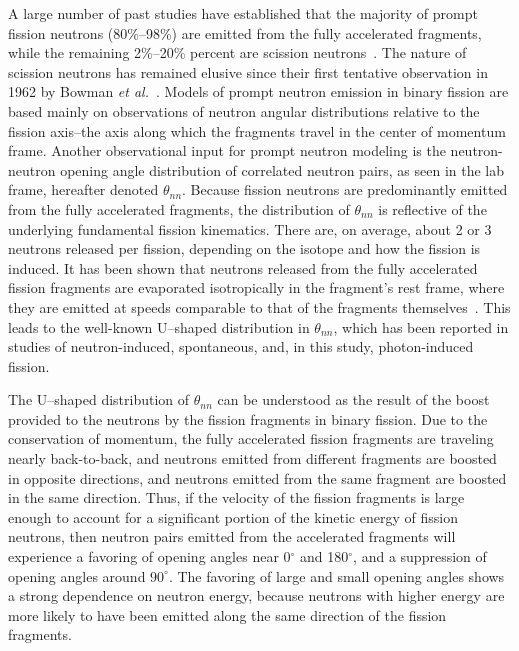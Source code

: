 A large number of past studies have established that the majority of prompt fission neutrons (80\%--98\%) are emitted from the fully accelerated fragments, while the remaining 2\%--20\% percent are scission neutrons~\cite{Scission2005}.
The nature of scission neutrons has remained elusive since their first tentative observation in 1962 by Bowman \emph{et al.}~\cite{Bowman}.
Models of prompt neutron emission in binary fission are based mainly on observations of neutron angular distributions relative to the fission axis--the axis along which the fragments travel in the center of momentum frame.
Another observational input for prompt neutron modeling is the neutron-neutron opening angle distribution of correlated neutron pairs, as seen in the lab frame, hereafter denoted $\theta_{nn}$.
Because fission neutrons are predominantly emitted from the fully accelerated fragments, the distribution of $\theta_{nn}$ is reflective of the underlying fundamental fission kinematics.
There are, on average, about 2 or 3 neutrons released per fission, depending on the isotope and how the fission is induced.
It has been shown that neutrons released from the fully accelerated fission fragments are evaporated isotropically in the fragment's rest frame, where they are emitted at speeds comparable to that of the fragments themselves~\cite{JORGENSEN}.
This leads to the well-known U--shaped distribution in $\theta_{nn}$, which has been reported in studies of neutron-induced, spontaneous, and, in this study, photon-induced fission.

The U--shaped distribution of $\theta_{nn}$ can be understood as the result of the boost provided to the neutrons by the fission fragments in binary fission.
Due to the conservation of momentum, the fully accelerated fission fragments are traveling nearly back-to-back, and neutrons emitted from different fragments are boosted in opposite directions, and neutrons emitted from the same fragment are boosted in the same direction.
Thus, if the velocity of the fission fragments is large enough to account for a significant portion of the kinetic energy of fission neutrons, then neutron pairs emitted from the accelerated fragments will experience a favoring of opening angles near 0$^{\circ}$ and 180$^{\circ}$, and a suppression of opening angles around $90^{\circ}$.
The favoring of large and small opening angles shows a strong dependence on neutron energy, because neutrons with higher energy are more likely to have been emitted along the same direction of the fission fragments.

